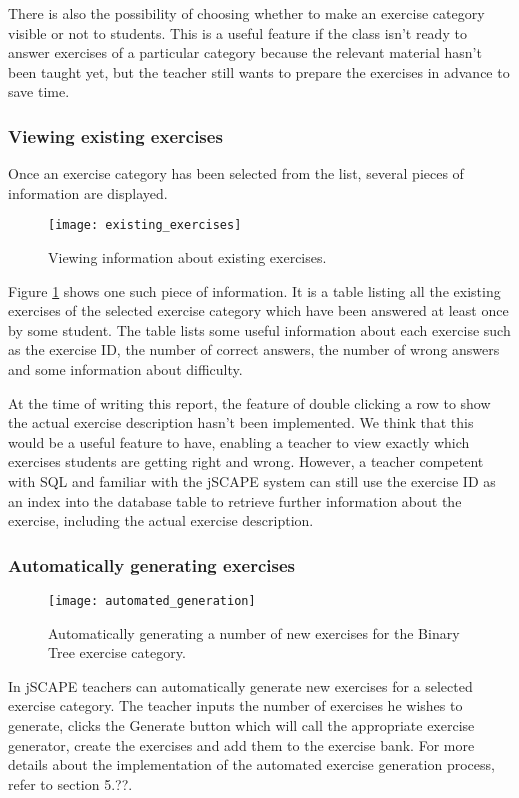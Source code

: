 There is also the possibility of choosing whether to make an exercise category visible or not to students. This is a useful feature if the class isn't ready to answer exercises of a particular category because the relevant material hasn't been taught yet, but the teacher still wants to prepare the exercises in advance to save time.
\subsubsection{Viewing existing exercises}
Once an exercise category has been selected from the list, several pieces of information are displayed.

\begin{figure}[H]
\centering
\texttt{[image: existing\_exercises]}
\caption{Viewing information about existing exercises.}
\label{fig:existing_exercises}
\end{figure}

Figure \ref{fig:existing_exercises} shows one such piece of information. It is a table listing all the existing exercises of the selected exercise category which have been answered at least once by some student. The table lists some useful information about each exercise such as the exercise ID, the number of correct answers, the number of wrong answers and some information about difficulty.\newline

At the time of writing this report, the feature of double clicking a row to show the actual exercise description hasn't been implemented. We think that this would be a useful feature to have, enabling a teacher to view exactly which exercises students are getting right and wrong. However, a teacher competent with SQL and familiar with the jSCAPE system can still use the exercise ID as an index into the database table to retrieve further information about the exercise, including the actual exercise description.

\subsubsection{Automatically generating exercises}
\begin{figure}[H]
\centering
\texttt{[image: automated\_generation]}
\caption{Automatically generating a number of new exercises for the Binary Tree exercise category.}
\label{fig:automated_generation}
\end{figure}

In jSCAPE teachers can automatically generate new exercises for a selected exercise category. The teacher inputs the number of exercises he wishes to generate, clicks the Generate button which will call the appropriate exercise generator, create the exercises and add them to the exercise bank. For more details about the implementation of the automated exercise generation process, refer to section 5.??.

